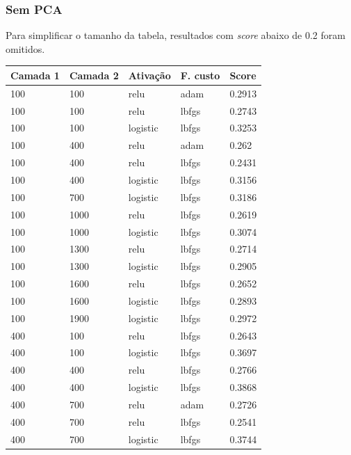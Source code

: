 \documentclass[conference]{IEEEtran}
\begin{document}
\subsubsection{Sem PCA}
Para simplificar o tamanho da tabela, resultados com \textit{score} abaixo de 0.2 foram omitidos.

\begin{center}
\begin{tabular}{| l | l | l | l | l |}
 \hline
\textbf{Camada 1} & \textbf{Camada 2} & \textbf{Ativação} & \textbf{F. custo} & \textbf{Score}  \\  \hline
100     & 100     & relu     & adam   & 0.2913 \\ \hline
100     & 100     & relu     & lbfgs  & 0.2743 \\ \hline
100     & 100     & logistic & lbfgs  & 0.3253 \\ \hline
100     & 400     & relu     & adam   & 0.262  \\ \hline
100     & 400     & relu     & lbfgs  & 0.2431 \\ \hline
100     & 400     & logistic & lbfgs  & 0.3156 \\ \hline
100     & 700     & logistic & lbfgs  & 0.3186 \\ \hline
100     & 1000    & relu     & lbfgs  & 0.2619 \\  \hline
100     & 1000    & logistic & lbfgs  & 0.3074 \\ \hline
100     & 1300    & relu     & lbfgs  & 0.2714 \\ \hline
100     & 1300    & logistic & lbfgs  & 0.2905 \\ \hline
100     & 1600    & relu     & lbfgs  & 0.2652 \\ \hline
100     & 1600    & logistic & lbfgs  & 0.2893 \\ \hline
100     & 1900    & logistic & lbfgs  & 0.2972 \\ \hline
400     & 100     & relu     & lbfgs  & 0.2643 \\ \hline
400     & 100     & logistic & lbfgs  & 0.3697 \\  \hline
400     & 400     & relu     & lbfgs  & 0.2766 \\ \hline
400     & 400     & logistic & lbfgs  & 0.3868 \\ \hline
400     & 700     & relu     & adam   & 0.2726 \\ \hline
400     & 700     & relu     & lbfgs  & 0.2541 \\ \hline
400     & 700     & logistic & lbfgs  & 0.3744 \\ \hline

\end{tabular}
\end{center}
\end{document}
